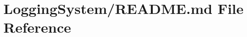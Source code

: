 \hypertarget{_logging_system_2_r_e_a_d_m_e_8md}{}\section{Logging\+System/\+R\+E\+A\+D\+ME.md File Reference}
\label{_logging_system_2_r_e_a_d_m_e_8md}
